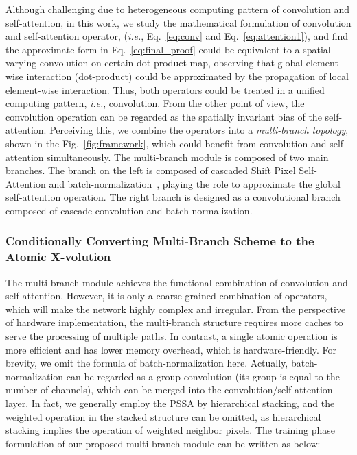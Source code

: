 \documentclass{article}
\begin{document}
Although challenging due to heterogeneous computing pattern of convolution and self-attention, in this work, we study the mathematical formulation of convolution and self-attention operator, (\emph{i.e.}, Eq.~\ref{eq:conv} and Eq.~\ref{eq:attention1}), and find the approximate form in Eq.~\ref{eq:final_proof} could be equivalent to a spatial varying convolution on certain dot-product map, observing that global element-wise interaction (dot-product) could be approximated by the propagation of local element-wise interaction.
Thus, both operators could be treated in a unified computing pattern, \emph{i.e.}, convolution.
From the other point of view, the convolution operation can be regarded as the spatially invariant bias of the self-attention.
Perceiving this, we combine the operators into a \emph{multi-branch topology}, shown in the Fig.~\ref{fig:framework}, which could benefit from convolution and self-attention simultaneously.
The multi-branch module is composed of two main branches.
The branch on the left is composed of cascaded Shift Pixel Self-Attention and batch-normalization~\cite{DBLP:conf/icml/IoffeS15}, playing the role to approximate the global self-attention operation.
The right branch is designed as a convolutional branch composed of cascade convolution and batch-normalization.







\subsubsection{Conditionally Converting Multi-Branch Scheme to the Atomic X-volution}
The multi-branch module achieves the functional combination of convolution and self-attention.
However, it is only a coarse-grained combination of operators, which will make the network highly complex and irregular.
From the perspective of hardware implementation, the multi-branch structure requires more caches to serve the processing of multiple paths.
In contrast, a single atomic operation is more efficient and has lower memory overhead, which is hardware-friendly.
For brevity, we omit the formula of batch-normalization here.
Actually, batch-normalization can be regarded as a  group convolution (its group is equal to the number of channels), which can be merged into the convolution/self-attention layer.
In fact, we generally employ the PSSA by hierarchical stacking, and the weighted operation in the stacked structure can be omitted, as hierarchical stacking implies the operation of weighted neighbor pixels.
The training phase formulation of our proposed multi-branch module can be written as below:
\end{document}
